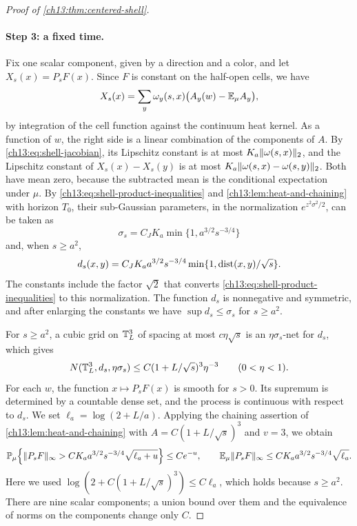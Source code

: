 \begin{proof}[Proof of \cref{ch13:thm:centered-shell}]
\paragraph{Step 3: a fixed time.}
Fix one scalar component, given by a direction and a color, and let $X_s(x)=P_sF(x)$. Since $F$ is constant on the half-open cells, we have
\begin{equation}\label{ch13:eq:embedded-heat}
 X_s(x)=\sum_y\omega_y(s,x)\bigl(A_y(w)-\mathbb E_\mu A_y\bigr),
\end{equation}
by integration of the cell function against the continuum heat kernel. As a function of $w$, the right side is a linear combination of the components of $A$. By \eqref{ch13:eq:shell-jacobian}, its Lipschitz constant is at most $K_a\lVert \omega(s,x)\rVert_2$, and the Lipschitz constant of $X_s(x)-X_s(y)$ is at most $K_a\lVert \omega(s,x)-\omega(s,y)\rVert_2$. Both have mean zero, because the subtracted mean is the conditional expectation under $\mu$. By \eqref{ch13:eq:shell-product-inequalities} and \cref{ch13:lem:heat-and-chaining} with horizon $T_0$, their sub-Gaussian parameters, in the normalization $e^{z^2\sigma^2/2}$, can be taken as
\begin{equation}\label{ch13:eq:shell-sigma}
 \sigma_s=C_JK_a\min\{1,a^{3/2}s^{-3/4}\}
\end{equation}
and, when $s\ge a^2$,
\begin{equation}\label{ch13:eq:shell-metric}
 d_s(x,y)=C_JK_aa^{3/2}s^{-3/4}\min\{1,\operatorname{dist}(x,y)/\sqrt s\}.
\end{equation}
The constants include the factor $\sqrt2$ that converts \eqref{ch13:eq:shell-product-inequalities} to this normalization. The function $d_s$ is nonnegative and symmetric, and after enlarging the constants we have $\sup d_s\le\sigma_s$ for $s\ge a^2$.

For $s\ge a^2$, a cubic grid on $\mathbb T_L^3$ of spacing at most $c\eta\sqrt s$ is an $\eta\sigma_s$-net for $d_s$, which gives
\[
 N(\mathbb T_L^3,d_s,\eta\sigma_s)\le C(1+L/\sqrt s)^3\eta^{-3}\qquad(0<\eta<1).
\]
For each $w$, the function $x\mapsto P_sF(x)$ is smooth for $s>0$. Its supremum is determined by a countable dense set, and the process is continuous with respect to $d_s$. We set $\ell_a=\log(2+L/a)$. Applying the chaining assertion of \cref{ch13:lem:heat-and-chaining} with $A=C(1+L/\sqrt s)^3$ and $v=3$, we obtain
\begin{equation}\label{ch13:eq:fixed-time-max}
 \mathbb P_\mu\Bigl\{\lVert P_sF\rVert_\infty>CK_aa^{3/2}s^{-3/4}\sqrt{\ell_a+u}\Bigr\}\le Ce^{-u},\qquad
 \mathbb E_\mu\lVert P_sF\rVert_\infty\le CK_aa^{3/2}s^{-3/4}\sqrt{\ell_a}.
\end{equation}
Here we used $\log(2+C(1+L/\sqrt s)^3)\le C\ell_a$, which holds because $s\ge a^2$. There are nine scalar components; a union bound over them and the equivalence of norms on the components change only $C$.


\end{proof}
